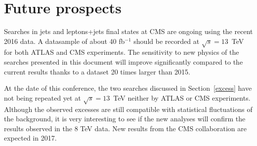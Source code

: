 \documentclass[epj]{webofc}
\begin{document}
\section{Future prospects}
\label{future}

Searches in jets and leptons+jets final states at CMS are ongoing
using the recent 2016 data.  A datasample of about  40 fb$^{-1}$ should be recorded at $\sqrt{s}=13$~TeV
for both ATLAS and CMS experiments. The sensitivity to new physics of 
the searches presented in this document will improve significantly
compared to the current results thanks to a dataset 20 times larger
than 2015.

At the date of this conference, the two searches 
discussed in Section~\ref{excess} have not being repeated yet at
$\sqrt{s}=13$~TeV neither by ATLAS or CMS experiments.
Although the observed excesses are still compatible with statistical
fluctuations of the background, it is very interesting to see if the
new analyses will confirm the results observed in the 8 TeV data. 
New results from the CMS collaboration are expected in 2017.



%
% 
%
%
\end{document}
